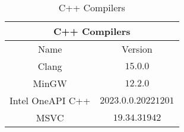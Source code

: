 \begin{table}[H]
    \centering
    \begin{tabular}{|| c | c ||}
    \hline
    \multicolumn{2}{||c||}{C++ Compilers} \\ [0.5ex] \hline\hline
    Name & Version \\\hline
    Clang & $15.0.0$ \\
    MinGW & $12.2.0$ \\
    Intel OneAPI C++ & $2023.0.0.20221201$ \\
    MSVC & $19.34.31942$ \\\hline
    \end{tabular}
    \caption{C++ Compilers}
    \label{tab:compilers}
\end{table}